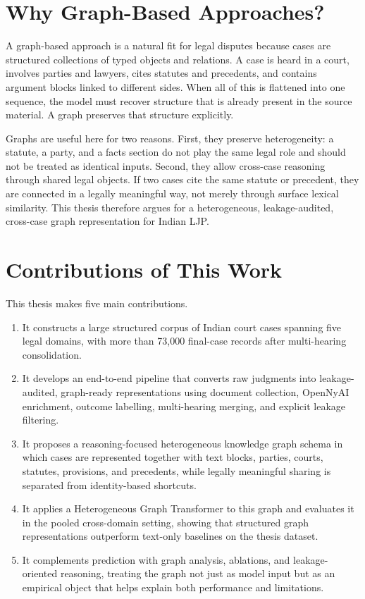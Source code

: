 \section{Why Graph-Based Approaches?}

A graph-based approach is a natural fit for legal disputes because cases are structured collections of typed objects and relations. A case is heard in a court, involves parties and lawyers, cites statutes and precedents, and contains argument blocks linked to different sides. When all of this is flattened into one sequence, the model must recover structure that is already present in the source material. A graph preserves that structure explicitly.

Graphs are useful here for two reasons. First, they preserve heterogeneity: a statute, a party, and a facts section do not play the same legal role and should not be treated as identical inputs. Second, they allow cross-case reasoning through shared legal objects. If two cases cite the same statute or precedent, they are connected in a legally meaningful way, not merely through surface lexical similarity. This thesis therefore argues for a heterogeneous, leakage-audited, cross-case graph representation for Indian LJP.

\section{Contributions of This Work}

This thesis makes five main contributions.

\begin{enumerate}
    \item It constructs a large structured corpus of Indian court cases spanning five legal domains, with more than 73{,}000 final-case records after multi-hearing consolidation.

    \item It develops an end-to-end pipeline that converts raw judgments into leakage-audited, graph-ready representations using document collection, OpenNyAI enrichment, outcome labelling, multi-hearing merging, and explicit leakage filtering.

    \item It proposes a reasoning-focused heterogeneous knowledge graph schema in which cases are represented together with text blocks, parties, courts, statutes, provisions, and precedents, while legally meaningful sharing is separated from identity-based shortcuts.

    \item It applies a Heterogeneous Graph Transformer to this graph and evaluates it in the pooled cross-domain setting, showing that structured graph representations outperform text-only baselines on the thesis dataset.

    \item It complements prediction with graph analysis, ablations, and leakage-oriented reasoning, treating the graph not just as model input but as an empirical object that helps explain both performance and limitations.
\end{enumerate}

